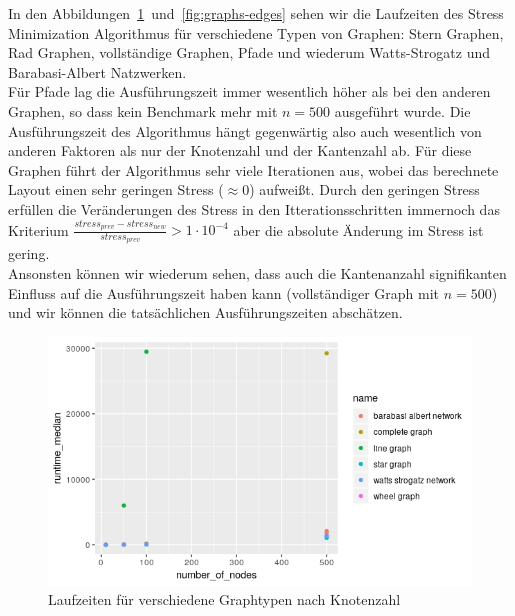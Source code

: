 \documentclass[]{article}
\begin{document}
In den Abbildungen~\ref{fig:graphs-nodes}~und~\ref{fig:graphs-edges} sehen wir die Laufzeiten des Stress Minimization Algorithmus für verschiedene Typen von Graphen: Stern Graphen, Rad Graphen, vollständige Graphen, Pfade und wiederum Watts-Strogatz und Barabasi-Albert Natzwerken. \\
Für Pfade lag die Ausführungszeit immer wesentlich höher als bei den anderen Graphen, so dass kein Benchmark mehr mit $n = 500$ ausgeführt wurde. Die Ausführungszeit des Algorithmus hängt gegenwärtig also auch wesentlich von anderen Faktoren als nur der Knotenzahl und der Kantenzahl ab. Für diese Graphen führt der Algorithmus sehr viele Iterationen aus, wobei das berechnete Layout einen sehr geringen Stress ($\approx 0$) aufweißt. Durch den geringen Stress erfüllen die Veränderungen des Stress in den Itterationsschritten immernoch das Kriterium $\frac{stress_{prev} - stress_{new}}{stress_{prev}} > 1 \cdot 10^{-4}$ aber die absolute Änderung im Stress ist gering. \\
Ansonsten können wir wiederum sehen, dass auch die Kantenanzahl signifikanten Einfluss auf die Ausführungszeit haben kann (vollständiger Graph mit $n = 500$) und wir können die tatsächlichen Ausführungszeiten abschätzen. 

\begin{figure}
    \centering
	\includegraphics[width=1\textwidth]{standard_benchmarks_nodes.jpeg}
    \caption{Laufzeiten für verschiedene Graphtypen nach Knotenzahl}
    \label{fig:graphs-nodes}
\end{figure}
\end{document}
